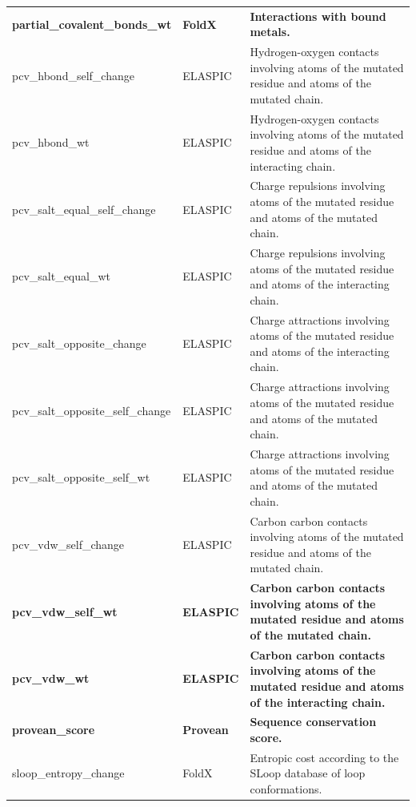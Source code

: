 \begin{table}[tb]
\begin{tabular}{ l | l | p{8cm} }
		\textbf{partial\_covalent\_bonds\_wt} & \textbf{FoldX}   & \textbf{Interactions with bound metals.}                                                                   \\
		pcv\_hbond\_self\_change              & ELASPIC          & Hydrogen-oxygen contacts involving atoms of the mutated residue and atoms of the mutated chain.            \\
		pcv\_hbond\_wt                        & ELASPIC          & Hydrogen-oxygen contacts involving atoms of the mutated residue and atoms of the interacting chain.        \\
		pcv\_salt\_equal\_self\_change        & ELASPIC          & Charge repulsions involving atoms of the mutated residue and atoms of the mutated chain.                   \\
		pcv\_salt\_equal\_wt                  & ELASPIC          & Charge repulsions involving atoms of the mutated residue and atoms of the interacting chain.               \\
		pcv\_salt\_opposite\_change           & ELASPIC          & Charge attractions involving atoms of the mutated residue and atoms of the interacting chain.              \\
		pcv\_salt\_opposite\_self\_change     & ELASPIC          & Charge attractions involving atoms of the mutated residue and atoms of the mutated chain.                  \\
		pcv\_salt\_opposite\_self\_wt         & ELASPIC          & Charge attractions involving atoms of the mutated residue and atoms of the mutated chain.                  \\
		pcv\_vdw\_self\_change                & ELASPIC          & Carbon carbon contacts involving atoms of the mutated residue and atoms of the mutated chain.              \\
		\textbf{pcv\_vdw\_self\_wt}           & \textbf{ELASPIC} & \textbf{Carbon carbon contacts involving atoms of the mutated residue and atoms of the mutated chain.}     \\
		\textbf{pcv\_vdw\_wt}                 & \textbf{ELASPIC} & \textbf{Carbon carbon contacts involving atoms of the mutated residue and atoms of the interacting chain.} \\
		\textbf{provean\_score}               & \textbf{Provean} & \textbf{Sequence conservation score.}                                                                      \\
		sloop\_entropy\_change                & FoldX            & Entropic cost according to the SLoop database of loop conformations.                                       \\

\end{tabular}
\end{table}
